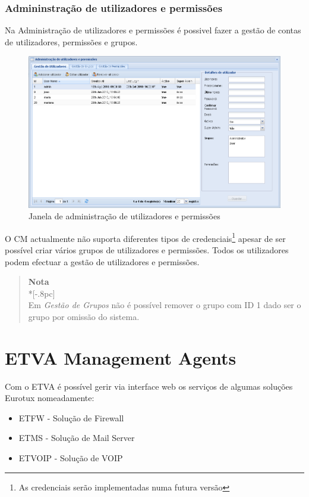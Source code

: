 \subsection{Admininstração de utilizadores e permissões}
Na Administração de utilizadores e permissões é possivel fazer a gestão de contas de utilizadores, permissões e grupos.

\begin{figure}[H]
        \begin{center}
        \includegraphics[scale=0.4]{screenshots/user_admin.png}
        \caption{Janela de administração de utilizadores e permissões}
        \label{fig:user_admin}
        \end{center}
\end{figure}

O CM actualmente não suporta diferentes tipos de credenciais\footnote{As credenciais serão implementadas numa futura versão} apesar de ser possível criar vários grupos de utilizadores e permissões.
Todos os utilizadores podem efectuar a gestão de utilizadores e permissões.

\begin{quote}
	{\large \bf Nota} \\*[-.8pc]
	\underline{\hspace{6in}} \\    
	Em \emph{Gestão de Grupos} não é possível remover o grupo com ID 1 dado ser o grupo por omissão do sistema.
\end{quote}

\pagebreak
\chapter{\textsf{ETVA Management Agents}}

Com o ETVA é possível gerir via interface web os serviços de algumas soluções Eurotux nomeadamente:
\begin{itemize}
	\item ETFW - Solução de Firewall
	\item ETMS - Solução de Mail Server
	\item ETVOIP - Solução de VOIP
\end{itemize}
    
